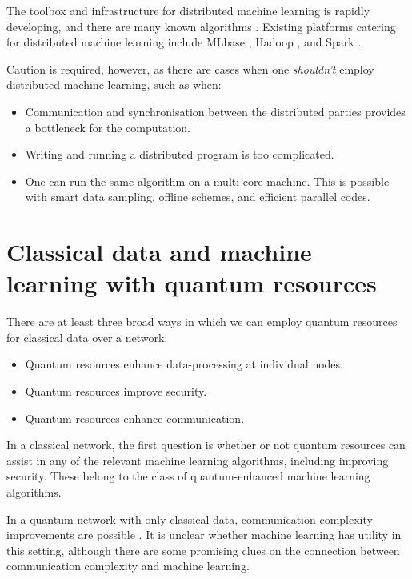 \documentclass[twocolumn, aps, rmp, amsmath, amssymb, nofootinbib, superscriptaddress, longbibliography, floatfix, table-of-contents, eqsecnum]{revtex4}
\begin{document}
The toolbox and infrastructure for distributed machine learning is rapidly developing, and there are many known algorithms \cite{bib:peteiro2013survey, bib:florian2013}. Existing platforms catering for distributed machine learning include MLbase \cite{bib:MLbase}, Hadoop \cite{bib:white2012hadoop}, and Spark \cite{bib:shanahan2015large}.

Caution is required, however, as there are cases when one \textit{shouldn't} employ distributed machine learning, such as when:
\begin{itemize}
\item Communication and synchronisation between the distributed parties provides a bottleneck for the computation.
\item Writing and running a distributed program is too complicated.
\item One can run the same algorithm on a multi-core machine. This is possible with smart data sampling, offline schemes, and efficient parallel codes.
\end{itemize}

\section{Classical data and machine learning with quantum resources}

There are at least three broad ways in which we can employ quantum resources for classical data over a network:
\begin{itemize}
\item Quantum resources enhance data-processing at individual nodes.
\item Quantum resources improve security.
\item Quantum resources enhance communication.
\end{itemize}

In a classical network, the first question is whether or not quantum resources can assist in any of the relevant machine learning algorithms, including improving security. These belong to the class of quantum-enhanced machine learning algorithms.

In a quantum network with only classical data, communication complexity improvements are possible \cite{bib:brassard2003quantum}. It is unclear whether machine learning has utility in this setting, although there are some promising clues \cite{bib:kane2017communication, bib:balcan2012distributed, bib:conitzer2004communication} on the connection between communication complexity and machine learning.
\end{document}
